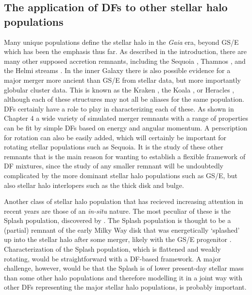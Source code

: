 \subsection{The application of DFs to other stellar halo populations}

Many unique populations define the stellar halo in the \textit{Gaia} era, beyond GS/E which has been the emphasis thus far. As described in the introduction, there are many other supposed accretion remnants, including the Sequoia \parencite{myeong19}, Thamnos \parencite{koppelman19b}, and the Helmi streams \parencite{helmi99,koppelman19a}. In the inner Galaxy there is also possible evidence for a major merger more ancient than GS/E from stellar data, but more importantly globular cluster data. This is known as the Kraken \parencite{kruijssen20}, the Koala \parencite{forbes20}, or Heracles \parencite{horta21a}, although each of these structures may not all be aliases for the same population. DFs certainly have a role to play in characterizing each of these. As shown in Chapter 4 a wide variety of simulated merger remnants with a range of properties can be fit by simple DFs based on energy and angular momentum. A perscription for rotation can also be easily added, which will certainly be important for rotating stellar populations such as Sequoia. It is the study of these other remnants that is the main reason for wanting to establish a flexible framework of DF mixtures, since the study of any smaller remnant will be undoubtedly complicated by the more dominant stellar halo populations such as GS/E, but also stellar halo interlopers such as the thick disk and bulge.

Another class of stellar halo population that has recieved increasing attention in recent years are those of an \textit{in-situ} nature. The most peculiar of these is the Splash population, discovered by \textcite{belokurov20}. The Splash population is thought to be a (partial) remnant of the early Milky Way disk that was energetically `splashed' up into the stellar halo after some merger, likely with the GS/E progenitor \parencite[although see ][for a different hypothesis]{amarante20b}. Characterization of the Splash population, which is flattened and weakly rotating, would be straightforward with a DF-based framework. A major challenge, however, would be that the Splash is of lower present-day stellar mass than some other halo populations and therefore modelling it in a joint way with other DFs representing the major stellar halo populations, is probably important.

